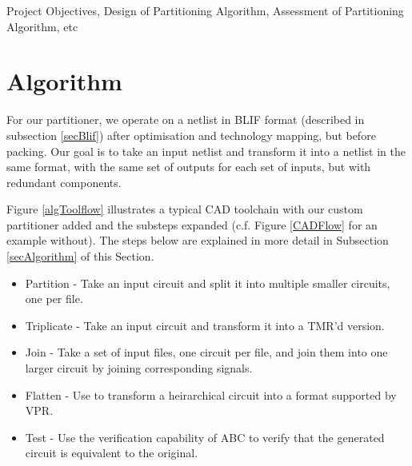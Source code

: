 \documentclass[12pt,final,oneside]{dwThesis} %
\begin{document}
   Project Objectives, Design of Partitioning Algorithm, Assessment of
   Partitioning Algorithm, etc



   \chapter{Algorithm}
   For our partitioner, we operate on a netlist in
   \gls{BLIF} format (described in subsection \ref{secBlif}) after optimisation
   and technology mapping, but before packing. Our goal is to take an input
   netlist and transform it into a netlist in the same format, with the same
   set of outputs for each set of inputs, but with redundant components.


   Figure \ref{algToolflow} illustrates a typical \gls{CAD} toolchain with our
   custom partitioner added and the substeps expanded (c.f. Figure
   \ref{CADFlow} for an example without). The steps below are explained in more
   detail in Subsection \ref{secAlgorithm} of this Section.  
   \begin{itemize}

      \item Partition - Take an input circuit and split it into multiple
         smaller circuits, one per file.
      \item Triplicate - Take an input circuit and transform it into a TMR'd
         version.
      \item Join - Take a set of input files, one circuit per file, and join
         them into one larger circuit by joining corresponding signals.
      \item Flatten - Use  to transform a heirarchical circuit into a
         format supported by VPR.
      \item Test - Use the verification capability of \gls{ABC} to verify that
         the generated circuit is equivalent to the original.  
   \end{itemize}
\end{document}
